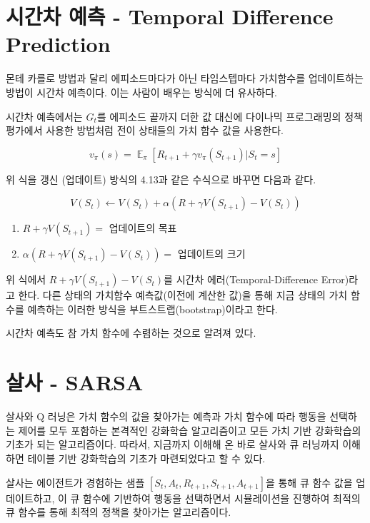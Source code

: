 \documentclass[ %
    a4paper,    %
    amsmath,    %
    itemph,     %
]{oblivoir}     %
\DeclareMathOperator{\E}{\mathbb{E}}
\begin{document}
\section{시간차 예측 - Temporal Difference Prediction}

몬테 카를로 방법과 달리 에피소드마다가 아닌 타임스텝마다 가치함수를 업데이트하는 
방법이 시간차 예측이다. 이는 사람이 배우는 방식에 더 유사하다. 

시간차 예측에서는 $G_t$를 에피소드 끝까지 더한 값 대신에 다이나믹 프로그래밍의 
정책 평가에서 사용한 방법처럼 전이 상태들의 가치 함수 값을 사용한다. 

$$
v_\pi(s) = \E_\pi[R_{t+1} + \gamma v_\pi(S_{t+1}) | S_t=s]
$$

위 식을 갱신 (업데이트) 방식의 4.13과 같은 수식으로 바꾸면 다음과 같다. 

\begin{tcolorbox}[title=수식 4.17]
$$
V(S_t) \leftarrow V(S_t) + \alpha(R + \gamma V(S_{t+1}) - V(S_t))
$$

\begin{enumerate}

\item $R+\gamma V(S_{t+1}) = $ 업데이트의 목표 

\item $\alpha (R + \gamma V(S_{t+1}) - V(S_t))=$ 업데이트의 크기 

\end{enumerate}

\end{tcolorbox}

위 식에서 $R + \gamma V(S_{t+1}) - V(S_t)$를 시간차 에러(Temporal-Difference Error)라고 한다. 
다른 상태의 가치함수 예측값(이전에 계산한 값)을 통해 지금 상태의 가치 함수를 예측하는 이러한 
방식을 부트스트랩(bootstrap)이라고 한다. 
 
시간차 예측도 참 가치 함수에 수렴하는 것으로 알려져 있다. 

\section{살사 - SARSA}

살사와 Q 러닝은 가치 함수의 값을 찾아가는 예측과 가치 함수에 따라 행동을 선택하는 제어를 
모두 포함하는 본격적인 강화학습 알고리즘이고 모든 가치 기반 강화학습의 기초가 되는 
알고리즘이다. 따라서, 지금까지 이해해 온 바로 살사와 큐 러닝까지 이해하면 테이블 기반 
강화학습의 기초가 마련되었다고 할 수 있다. 

살사는 에이전트가 경험하는 샘플 $[S_t, A_t, R_{t+1}, S_{t+1}, A_{t+1}]$을 통해 
큐 함수 값을 업데이트하고, 이 큐 함수에 기반하여 행동을 선택하면서 시뮬레이션을 
진행하여 최적의 큐 함수를 통해 최적의 정책을 찾아가는 알고리즘이다. 
\end{document}
